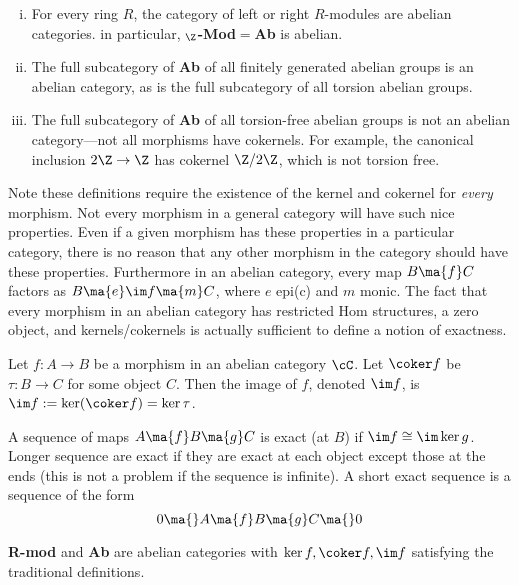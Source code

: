 \begin{ex} \hfill
	\begin{enumerate}[(i)]
	\item For every ring $R$, the category of left or right $R$-modules are abelian categories. in particular, $_\Z$\textbf{-Mod}$=$\textbf{Ab} is abelian.
	\item The full subcategory of \textbf{Ab} of all finitely generated abelian groups is an abelian category, as is the full subcategory of all torsion abelian groups. 
	\item The full subcategory of \textbf{Ab} of all torsion-free abelian groups is not an abelian category---not all morphisms have cokernels. For example, the canonical inclusion $2\Z \to \Z$ has cokernel $\Z/2\Z$, which is not torsion free. 
	\end{enumerate} \xqed
\end{ex}


Note these definitions require the existence of the kernel and cokernel for \emph{every} morphism. Not every morphism in a general category will have such nice properties. Even if a given morphism has these properties in a particular category, there is no reason that any other morphism in the category should have these properties. Furthermore in an abelian category, every map $B \ma{f} C$ factors as $B \ma{e} \im f \ma{m} C$, where $e$ epi(c) and $m$ monic. The fact that every morphism in an abelian category has restricted Hom structures, a zero object, and kernels/cokernels is actually sufficient to define a notion of exactness. 


\begin{dfn}[Image]
Let $f: A \to B$ be a morphism in an abelian category $\cC$. Let $\coker f$ be $\tau: B \to C$ for some object $C$. Then the image of $f$, denoted $\im f$, is $\im f:= \ker(\coker f)=\ker \tau$. 
\end{dfn}


\begin{dfn}[Exact]
A sequence of maps $A \ma{f} B \ma{g} C$ is exact (at $B$) if $\im f \cong \im \ker g$. Longer sequence are exact if they are exact at each object except those at the ends (this is not a problem if the sequence is infinite). A short exact sequence is a sequence of the form
	\[
	0 \ma{} A \ma{f} B \ma{g} C \ma{} 0
	\]
\end{dfn}


\begin{prop}
\textbf{R-mod} and \textbf{Ab} are abelian categories with $\ker f,\coker f,\im f$ satisfying the traditional definitions. 
\end{prop}


